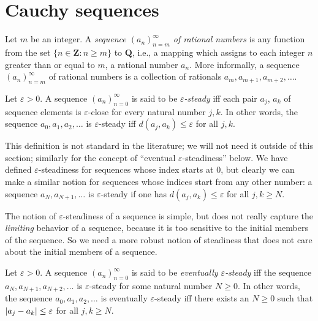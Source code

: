 \section{Cauchy sequences}\label{sec 5.1}

\begin{definition}[Sequences]\label{5.1.1}
    Let \(m\) be an integer.
    A \emph{sequence \((a_n)_{n = m}^{\infty}\) of rational numbers} is any function from the set \(\{n \in \mathbf{Z} : n \geq m\}\) to \(\mathbf{Q}\), i.e., a mapping which assigns to each integer \(n\) greater than or equal to \(m\), a rational number \(a_n\).
    More informally, a sequence \((a_n)_{n = m}^{\infty}\) of rational numbers is a collection of rationals \(a_m, a_{m + 1}, a_{m + 2}, \dots\).
\end{definition}

\setcounter{theorem}{2}
\begin{definition}\label{5.1.3}
    Let \(\varepsilon > 0\).
    A sequence \((a_n)_{n = 0}^{\infty}\) is said to be \emph{\(\varepsilon\)-steady} iff each pair \(a_j\), \(a_k\) of sequence elements is \(\varepsilon\)-close for every natural number \(j, k\).
    In other words, the sequence \(a_0, a_1, a_2, \dots\) is \(\varepsilon\)-steady iff \(d(a_j, a_k) \leq \varepsilon\) for all \(j, k\).
\end{definition}

\begin{remark}\label{5.1.4}
    This definition is not standard in the literature;
    we will not need it outside of this section;
    similarly for the concept of ``eventual \(\varepsilon\)-steadiness'' below.
    We have defined \(\varepsilon\)-steadiness for sequences whose index starts at \(0\), but clearly we can make a similar notion for sequences whose indices start from any other number:
    a sequence \(a_N, a_{N + 1}, \dots\) is \(\varepsilon\)-steady if one has \(d(a_j, a_k) \leq \varepsilon\) for all \(j, k \geq N\).
\end{remark}

\begin{note}
    The notion of \(\varepsilon\)-steadiness of a sequence is simple, but does not really capture the \emph{limiting} behavior of a sequence, because it is too sensitive to the initial members of the sequence.
    So we need a more robust notion of steadiness that does not care about the initial members of a sequence.
\end{note}

\setcounter{theorem}{5}
\begin{definition}\label{5.1.6}
    Let \(\varepsilon > 0\).
    A sequence \((a_n)_{n = 0}^{\infty}\) is said to be \emph{eventually \(\varepsilon\)-steady} iff the sequence \(a_N, a_{N + 1}, a_{N + 2}, \dots\) is \(\varepsilon\)-steady for some natural number \(N \geq 0\).
    In other words, the sequence \(a_0, a_1, a_2, \dots\) is eventually \(\varepsilon\)-steady iff there exists an \(N \geq 0\) such that \(\abs*{a_j - a_k} \leq \varepsilon\) for all \(j, k \geq N\).
\end{definition}

